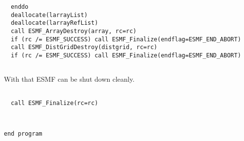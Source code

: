 
 \begin{verbatim}
  enddo
  deallocate(larrayList)
  deallocate(larrayRefList)
  call ESMF_ArrayDestroy(array, rc=rc)
  if (rc /= ESMF_SUCCESS) call ESMF_Finalize(endflag=ESMF_END_ABORT)
  call ESMF_DistGridDestroy(distgrid, rc=rc)
  if (rc /= ESMF_SUCCESS) call ESMF_Finalize(endflag=ESMF_END_ABORT)
 
\end{verbatim}
 

   With that ESMF can be shut down cleanly. 

 \begin{verbatim}

  call ESMF_Finalize(rc=rc)
  
 
\end{verbatim}
 

 \begin{verbatim}
end program
 
\end{verbatim}

\setlength{\parskip}{\oldparskip}
\setlength{\parindent}{\oldparindent}
\setlength{\baselineskip}{\oldbaselineskip}
